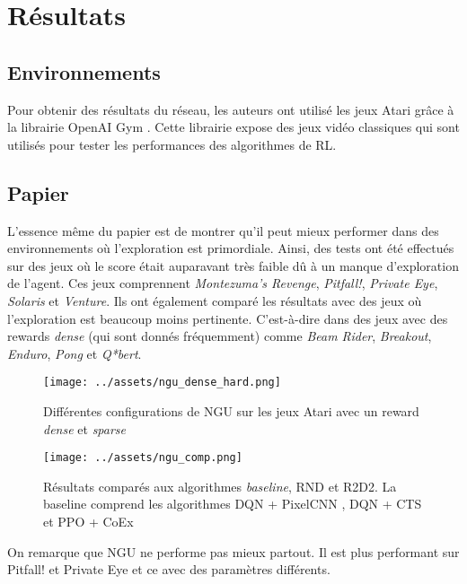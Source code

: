 \section{Résultats}

\subsection{Environnements}

Pour obtenir des résultats du réseau, les auteurs ont utilisé les jeux Atari grâce à la librairie OpenAI Gym \cite{OpenAI_Gym}. Cette librairie expose des jeux vidéo classiques qui sont utilisés pour tester les performances des algorithmes de RL.

\subsection{Papier}

L'essence même du papier est de montrer qu'il peut mieux performer dans des environnements où l'exploration est primordiale. Ainsi, des tests ont été effectués sur des jeux où le score était auparavant très faible dû à un manque d'exploration de l'agent. Ces jeux comprennent \textit{Montezuma's Revenge}, \textit{Pitfall!}, \textit{Private Eye}, \textit{Solaris} et \textit{Venture}. Ils ont également comparé les résultats avec des jeux où l'exploration est beaucoup moins pertinente. C'est-à-dire dans des jeux avec des rewards \textit{dense} (qui sont donnés fréquemment) comme \textit{Beam Rider}, \textit{Breakout}, \textit{Enduro}, \textit{Pong} et \textit{Q*bert}.

\begin{figure}[H]
    \centering
    \texttt{[image: ../assets/ngu\_dense\_hard.png]}
    \caption{Différentes configurations de NGU sur les jeux Atari avec un reward \textit{dense} et \textit{sparse}}
\end{figure}

\begin{figure}[H]
    \centering
    \texttt{[image: ../assets/ngu\_comp.png]}
    \caption{Résultats comparés aux algorithmes \textit{baseline}, RND et R2D2. La baseline comprend les algorithmes DQN + PixelCNN \cite{DQNPixelCNN}, DQN + CTS et PPO + CoEx \cite{PPO_CoEx}}
\end{figure}

On remarque que NGU ne performe pas mieux partout. Il est plus performant sur Pitfall! et Private Eye et ce avec des paramètres différents.


